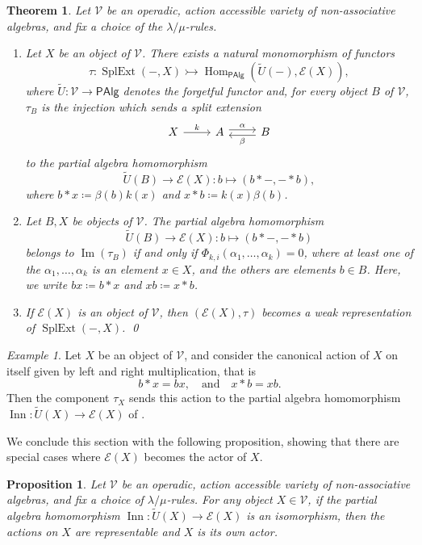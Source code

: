 \documentclass[reqno,a4paper]{amsart}
\theoremstyle{plain}
\newtheorem{theorem}[subsection]{Theorem}
\newtheorem{proposition}[subsection]{Proposition}
\theoremstyle{definition}
\theoremstyle{remark}
\newtheorem{example}[subsection]{Example}
\numberwithin{equation}{section}
\newcommand{\noproof}{\hfil\qed}
\newcommand{\E}{\mathcal{E}}
\newcommand{\V}{\mathcal{V}}
\DeclareMathOperator{\Hom}{Hom}
\DeclareMathOperator{\SplExt}{SplExt}
\DeclareMathOperator{\Imm}{Im}
\DeclareMathOperator{\Inn}{Inn}
\newcommand{\PAlg}{\ensuremath{\mathsf{PAlg}}}
\begin{document}
\begin{theorem}\cite{WRAAlg}\label{thmV}
Let $\V$ be an operadic, action accessible variety of non-associative algebras, and fix a choice of the $\lambda/\mu$-rules.
\begin{enumerate}
\item Let $X$ be an object of $\V$. There exists a natural monomorphism of functors
\[
\tau \colon \SplExt(-,X) \rightarrowtail \Hom_{\PAlg}(\widetilde{U}(-),\E(X)),
\]
where $\widetilde{U} \colon \V \to \PAlg$ denotes the forgetful functor and, for every object $B$ of $\V$, $\tau_B$ is the injection which sends a split extension
\[
\begin{tikzcd}
X\arrow [r, "k"]
&A \arrow[r, shift left, "\alpha"] &
B\ar[l, shift left, "\beta"]
\end{tikzcd}
\]
to the partial algebra homomorphism
\[
\widetilde{U}(B) \to \E(X) \colon b \mapsto (b \ast -, - \ast b),
\]
where $b \ast x \coloneqq \beta(b)k(x)$ and $x \ast b \coloneqq k(x)\beta(b)$.
\item Let $B, X$ be objects of $\V$. The partial algebra homomorphism
\[
\widetilde{U}(B) \to \E(X) \colon b \mapsto (b \ast -,- \ast b)
\]
belongs to $\Imm(\tau_B)$ if and only if $\Phi_{k,i}(\alpha_1,\ldots,\alpha_k)=0$, where at least one of the $\alpha_1, \ldots, \alpha_k$ is an element $x \in X$, and the others are elements $b \in B$. Here, we write $bx\coloneq b\ast x$ and $xb\coloneq x\ast b$. 
\item If $\E(X)$ is an object of $\V$, then $(\E(X),\tau)$ becomes a weak representation of $\SplExt(-,X)$.
\noproof
\end{enumerate}
\end{theorem}

\begin{example}
Let $X$ be an object of $\V$, and consider the canonical action of $X$ on itself given by left and right multiplication, that is
\[
b \ast x = bx, \quad \text{and} \quad x \ast b = xb.
\]
Then the component $\tau_X$ sends this action to the partial algebra homomorphism $\Inn \colon \widetilde{U}(X) \to \E(X)$ of .
\end{example}

We conclude this section with the following proposition, showing that there are special cases where $\E(X)$ becomes the actor of $X$.

\begin{proposition}\label{prop_e(x)}
Let $\V$ be an operadic, action accessible variety of non-associative algebras, and fix a choice of $\lambda/\mu$-rules. For any object $X \in \V$, if the partial algebra homomorphism $\Inn \colon \widetilde{U}(X) \to \E(X)$ is an isomorphism, then the actions on $X$ are representable and $X$ is its own actor.
\end{proposition}
\end{document}
